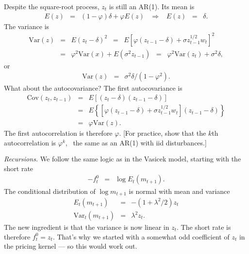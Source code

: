 \documentclass[11pt]{article}
\begin{document}
Despite the square-root process, $z_t$ is still an AR(1).
Its mean is
\begin{eqnarray*}
    E(z) &=& (1-\varphi) \delta + \varphi E(z)
            \;\;\;\Rightarrow\;\;\; E(z) \;\;=\;\; \delta .
\end{eqnarray*}
The variance is
\begin{eqnarray*}
    \mbox{Var}(z) &=& E (z_t - \delta)^2
                \;\;=\;\; E \left[ \varphi (z_{t-1} - \delta) + \sigma z_{t-1}^{1/2} w_t \right]^2 \\
                &=& \varphi^2 \mbox{Var}(x) + E (\sigma^2 z_{t-1})
                \;\;=\;\;  \varphi^2 \mbox{Var}(z_{t}) + \sigma^2 \delta ,
\end{eqnarray*}
or
\begin{eqnarray*}
    \mbox{Var}(z) &=&   \sigma^2 \delta / (1-\varphi^2) .
\end{eqnarray*}
What about the autocovariance?
The first autocovariance is
\begin{eqnarray*}
    \mbox{Cov}(z_t,z_{t-1}) &=& E [(z_t - \delta)(z_{t-1} - \delta)]  \\
                &=& E  \left\{ [ \varphi (z_{t-1} - \delta) + \sigma z_{t-1}^{1/2} w_t ]
                (z_{t-1} - \delta) \right\} \\
                &=& \varphi \mbox{Var}(z) .
\end{eqnarray*}
The first autocorrelation is therefore $\varphi$.
[For practice, show that the $k$th autocorrelation is $\varphi^k$, \
the same as an AR(1) with iid disturbances.]

{\it Recursions.\/}
We follow the same logic as in the Vasicek model,
starting with the short rate
\begin{eqnarray*}
    - f^0_t &=&   \log E_t (m_{t+1} ).
\end{eqnarray*}
The conditional distribution of $\log m_{t+1}$ is
normal with mean and variance
\begin{eqnarray*}
    E_t (m_{t+1}) &=& - (1+\lambda^2/2) z_t \\
    \mbox{Var}_t (m_{t+1}) &=& \lambda^2 z_t .
\end{eqnarray*}
The new ingredient is that the variance is now linear in $z_t$.
The short rate is therefore
$ f^0_t = z_t $.
That's why we started with a somewhat odd coefficient of $z_t$
in the pricing kernel --- so this would work out.
\end{document}
